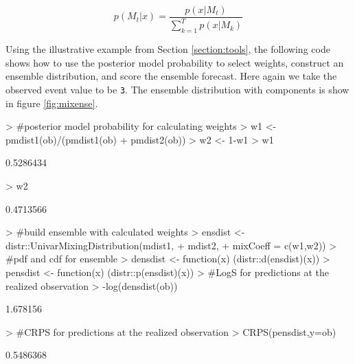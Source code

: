\documentclass[11pt,notitlepage]{isuthesis}
\begin{document}
\begin{equation}
\label{eq:pmpeq}
p(M_t|x) =  \frac{p(x|M_t)}{\sum_{k=1}^Tp(x|M_k)}
\end{equation}



Using the illustrative example from Section \ref{section:tools}, 
the following code shows how
to use the posterior model probability to select weights, construct an 
ensemble distribution, and score the ensemble forecast. Here again we take the 
observed event value to be \texttt{3}.
The ensemble distribution
with components is show in figure \ref{fig:mixense}.

\begin{Schunk}
\begin{Sinput}
> #posterior model probability for calculating weights
> w1 <- pmdist1(ob)/(pmdist1(ob) + pmdist2(ob))
> w2 <- 1-w1
> w1
\end{Sinput}
\begin{Soutput}
[1] 0.5286434
\end{Soutput}
\begin{Sinput}
> w2
\end{Sinput}
\begin{Soutput}
[1] 0.4713566
\end{Soutput}
\begin{Sinput}
> #build ensemble with calculated weights
> ensdist <- distr::UnivarMixingDistribution(mdist1,
+                                            mdist2,
+                                            mixCoeff = c(w1,w2))
> #pdf and cdf for ensemble
> densdist <- function(x) {(distr::d(ensdist)(x))}
> pensdist <- function(x) {(distr::p(ensdist)(x))}
> #LogS for predictions at the realized observation
> -log(densdist(ob))
\end{Sinput}
\begin{Soutput}
[1] 1.678156
\end{Soutput}
\begin{Sinput}
> #CRPS for predictions at the realized observation
> CRPS(pensdist,y=ob)
\end{Sinput}
\begin{Soutput}
[1] 0.5486368
\end{Soutput}
\end{Schunk}
\end{document}
